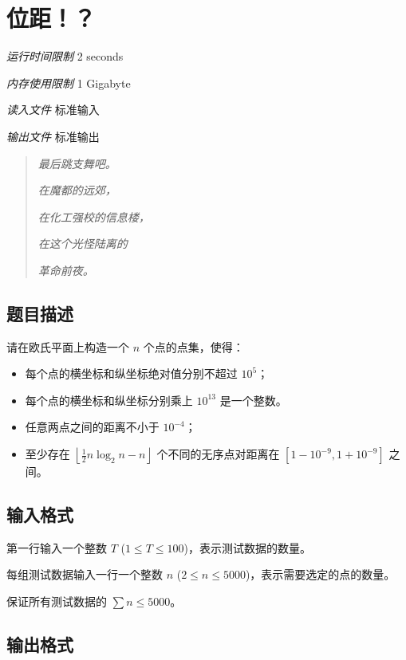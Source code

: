 \section[D. 位距！？]{ 位距！？}

\textit{运行时间限制}   2 seconds

\textit{内存使用限制} 1 Gigabyte

\textit{读入文件} \qquad 标准输入

\textit{输出文件} \qquad 标准输出


\begin{quote}
	\textit{最后跳支舞吧。}

	\textit{在魔都的远郊，}

	\textit{在化工强校的信息楼，}

	\textit{在这个光怪陆离的}

	\textit{革命前夜。}
\end{quote}

\subsection{题目描述}

请在欧氏平面上构造一个 $n$ 个点的点集，使得：

\begin{itemize}
	\item 每个点的横坐标和纵坐标绝对值分别不超过 $10^5$；
	\item 每个点的横坐标和纵坐标分别乘上 $10^{13}$ 是一个整数。
	\item 任意两点之间的距离不小于 $10^{-4}$；
	\item 至少存在 $\left\lfloor \frac{1}{2}n\log_2 n - n \right\rfloor$ 个不同的无序点对距离在 $[1 - 10^{-9}, 1 + 10^{-9}]$ 之间。
\end{itemize}


\subsection{输入格式}

第一行输入一个整数 $T$ ($1 \le T \le 100$)，表示测试数据的数量。

每组测试数据输入一行一个整数 $n$ ($2 \le n \le 5000$)，表示需要选定的点的数量。

保证所有测试数据的 $\sum n \le 5000$。

\subsection{输出格式}

